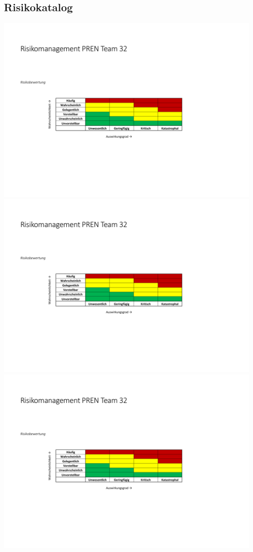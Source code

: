 \documentclass[a4paper,10pt,fleqn]{article} %
\begin{document}
\begin{appendix}
   		
   		\begin{landscape}
   			\section{Risikokatalog}
   			\includegraphics[page=1,scale=0.73,clip,trim=17mm 27mm 31mm 39mm]{Anhang/Risikomanagement.pdf}
   			\newpage  			
   			\includegraphics[page=2,scale=1,clip,trim=20mm 22mm 21mm 32mm]{Anhang/Risikomanagement.pdf}
   			\newpage  			
   			\includegraphics[page=3,scale=1,clip,trim=20mm 22mm 21mm 22mm]{Anhang/Risikomanagement.pdf}

\end{landscape}
\end{appendix}
\end{document}
